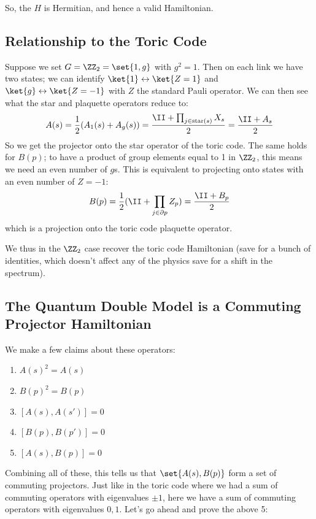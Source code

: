So, the $H$ is Hermitian, and hence a valid Hamiltonian.

\subsection{Relationship to the Toric Code}
Suppose we set $G = \ZZ_2 = \set{1, g}$ with $g^2 = 1$. Then on each link we have two states; we can identify $\ket{1} \leftrightarrow \ket{Z = 1}$ and $\ket{g} \leftrightarrow \ket{Z = -1}$ with $Z$ the standard Pauli operator. We can then see what the star and plaquette operators reduce to:
\begin{equation}
    A(s) = \frac{1}{2}(A_1(s) + A_g(s)) = \frac{\II + \prod_{j \in \text{star}(s)}X_s}{2}= \frac{\II + A_s}{2}
\end{equation}
So we get the projector onto the star operator of the toric code. The same holds for $B(p)$; to have a product of group elements equal to 1 in $\ZZ_2$, this means we need an even number of $g$s. This is equivalent to projecting onto states with an even number of $Z = -1$:
\begin{equation}
    B(p) = \frac{1}{2}(\II + \prod_{j \in \partial p}Z_p) = \frac{\II + B_p}{2}
\end{equation}
which is a projection onto the toric code plaquette operator.

We thus in the $\ZZ_2$ case recover the toric code Hamiltonian (save for a bunch of identities, which doesn't affect any of the physics save for a shift in the spectrum).

\subsection{The Quantum Double Model is a Commuting Projector Hamiltonian}
We make a few claims about these operators:
\begin{enumerate}
    \item $A(s)^2 = A(s)$
    \item $B(p)^2 = B(p)$
    \item $[A(s), A(s')] = 0$
    \item $[B(p), B(p')] = 0$
    \item $[A(s), B(p)] = 0$
\end{enumerate}
Combining all of these, this tells us that $\set{A(s), B(p)}$ form a set of commuting projectors. Just like in the toric code where we had a sum of commuting operators with eigenvalues $\pm 1$, here we have a sum of commuting operators with eigenvalues $0, 1$. Let's go ahead and prove the above 5:

